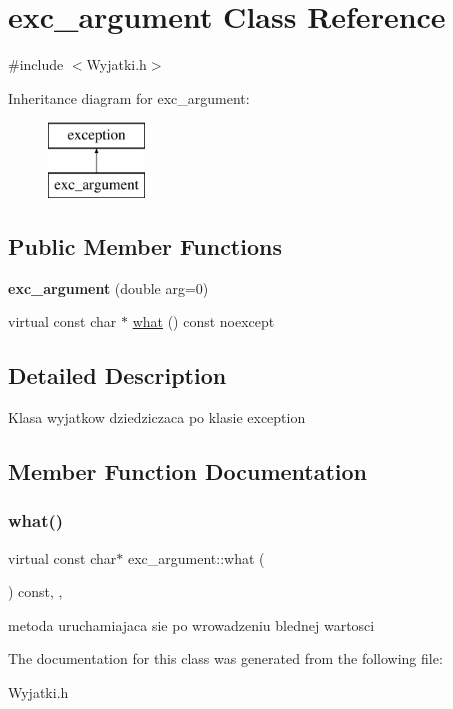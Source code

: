 \hypertarget{classexc__argument}{}\section{exc\+\_\+argument Class Reference}
\label{classexc__argument}


{\ttfamily \#include $<$Wyjatki.\+h$>$}

Inheritance diagram for exc\+\_\+argument\+:\begin{figure}[H]
\begin{center}
\leavevmode
\includegraphics[height=2.000000cm]{classexc__argument}
\end{center}
\end{figure}
\subsection*{Public Member Functions}
\begin{DoxyCompactItemize}
\item 
\mbox{\label{classexc__argument_a3e893e3da4e63c23a0709130bab2dd73}} 
{\bfseries exc\+\_\+argument} (double arg=0)
\item 
virtual const char $\ast$ \mbox{\hyperlink{classexc__argument_a0b2a620ca9b3e2206fb8a8fe9e4c6c20}{what}} () const noexcept
\end{DoxyCompactItemize}


\subsection{Detailed Description}
Klasa wyjatkow dziedziczaca po klasie exception 

\subsection{Member Function Documentation}
\mbox{\label{classexc__argument_a0b2a620ca9b3e2206fb8a8fe9e4c6c20}} 
\subsubsection{\texorpdfstring{what()}{what()}}
{\footnotesize\ttfamily virtual const char$\ast$ exc\+\_\+argument\+::what (\begin{DoxyParamCaption}{ }\end{DoxyParamCaption}) const\hspace{0.3cm}{\ttfamily [inline]}, {\ttfamily [virtual]}, {\ttfamily [noexcept]}}

metoda uruchamiajaca sie po wrowadzeniu blednej wartosci 

The documentation for this class was generated from the following file\+:\begin{DoxyCompactItemize}
\item 
Wyjatki.\+h\end{DoxyCompactItemize}
